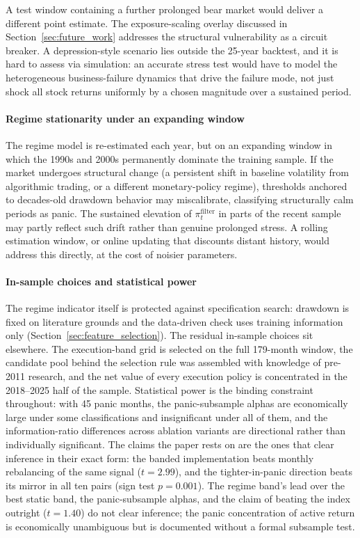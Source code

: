 A test window containing a further prolonged bear market would deliver a different point estimate. The exposure-scaling overlay discussed in Section~\ref{sec:future_work} addresses the structural vulnerability as a circuit breaker. A depression-style scenario lies outside the 25-year backtest, and it is hard to assess via simulation: an accurate stress test would have to model the heterogeneous business-failure dynamics that drive the failure mode, not just shock all stock returns uniformly by a chosen magnitude over a sustained period.

\bigskip\paragraph{Regime stationarity under an expanding window}
The regime model is re-estimated each year, but on an expanding window in which the 1990s and 2000s permanently dominate the training sample. If the market undergoes structural change (a persistent shift in baseline volatility from algorithmic trading, or a different monetary-policy regime), thresholds anchored to decades-old drawdown behavior may miscalibrate, classifying structurally calm periods as panic. The sustained elevation of $\pi_t^{\text{filter}}$ in parts of the recent sample may partly reflect such drift rather than genuine prolonged stress. A rolling estimation window, or online updating that discounts distant history, would address this directly, at the cost of noisier parameters.

\bigskip\paragraph{In-sample choices and statistical power}
The regime indicator itself is protected against specification search: drawdown is fixed on literature grounds and the data-driven check uses training information only (Section~\ref{sec:feature_selection}). The residual in-sample choices sit elsewhere. The execution-band grid is selected on the full 179-month window, the candidate pool behind the selection rule was assembled with knowledge of pre-2011 research, and the net value of every execution policy is concentrated in the 2018--2025 half of the sample. Statistical power is the binding constraint throughout: with 45 panic months, the panic-subsample alphas are economically large under some classifications and insignificant under all of them, and the information-ratio differences across ablation variants are directional rather than individually significant. The claims the paper rests on are the ones that clear inference in their exact form: the banded implementation beats monthly rebalancing of the same signal ($t = 2.99$), and the tighter-in-panic direction beats its mirror in all ten pairs (sign test $p = 0.001$). The regime band's lead over the best static band, the panic-subsample alphas, and the claim of beating the index outright ($t = 1.40$) do not clear inference; the panic concentration of active return is economically unambiguous but is documented without a formal subsample test.

